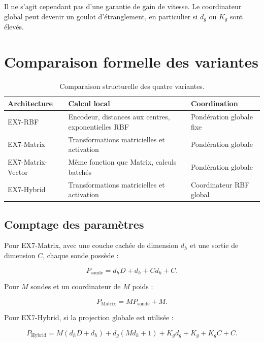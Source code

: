 \documentclass[11pt,a4paper]{article}
\begin{document}
Il ne s'agit cependant pas d'une garantie de gain de vitesse.
Le coordinateur global peut devenir un goulot d'étranglement,
en particulier si \(d_g\) ou \(K_g\) sont élevés.

\section{Comparaison formelle des variantes}

\begin{table}[H]
\centering
\small
\begin{tabularx}{\textwidth}{
  >{\raggedright\arraybackslash}p{2.4cm}
  X
  >{\centering\arraybackslash}p{2.2cm}
}
\toprule
Architecture & Calcul local & Coordination\\
\midrule
EX7-RBF
&
Encodeur, distances aux centres, exponentielles RBF
&
Pondération globale fixe\\

EX7-Matrix
&
Transformations matricielles et activation
&
Pondération globale\\

EX7-Matrix-Vector
&
Même fonction que Matrix, calculs batchés
&
Pondération globale\\

EX7-Hybrid
&
Transformations matricielles et activation
&
Coordinateur RBF global\\
\bottomrule
\end{tabularx}
\caption{Comparaison structurelle des quatre variantes.}
\end{table}

\subsection{Comptage des paramètres}

Pour EX7-Matrix, avec une couche cachée de dimension \(d_h\)
et une sortie de dimension \(C\), chaque sonde possède :

\[
  P_{\mathrm{sonde}}
  =
  d_hD+d_h+Cd_h+C.
\]

Pour \(M\) sondes et un coordinateur de \(M\) poids :

\[
  P_{\mathrm{Matrix}}
  =
  M P_{\mathrm{sonde}}+M.
\]

Pour EX7-Hybrid, si la projection globale est utilisée :

\[
  P_{\mathrm{Hybrid}}
  =
  M(d_hD+d_h)
  +d_g(Md_h+1)
  +K_gd_g
  +K_g
  +K_gC+C.
\]
\end{document}
